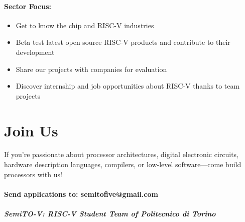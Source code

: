 \documentclass{article}
\begin{document}
\paragraph{Sector Focus:}

\begin{itemize}
    \item Get to know the chip and RISC-V industries
    \item Beta test latest open source RISC-V products and contribute to their development
    \item Share our projects with companies for evaluation
    \item Discover internship and job opportunities about RISC-V thanks to team projects
\end{itemize}

\section{Join Us}

If you're passionate about processor architectures, digital electronic circuits, hardware description languages, compilers, or low-level software—come build processors with us!

\paragraph{Send applications to: semitofive@gmail.com}

\subparagraph{\textit{SemiTO-V: RISC-V Student Team of Politecnico di Torino}}
\end{document}
